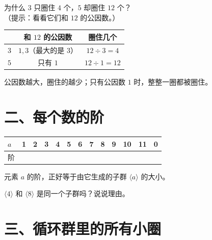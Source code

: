 \begin{sikao}
  为什么 \(3\) 只圈住 \(4\) 个，\(5\) 却圈住 \(12\) 个？\\
  （提示：看看它们和 \(12\) 的公因数。）
\end{sikao}

\begin{example}
  \begin{center}
  \begin{tabular}{@{}lcc@{}}
    \toprule
     & 和 \(12\) 的公因数 & 圈住几个 \\
    \midrule
    \(3\) & \(1,3\)（最大的是 \(3\)） & \(12\div3=4\) \\
    \(5\) & 只有 \(1\) & \(12\div1=12\) \\
    \bottomrule
  \end{tabular}
  \end{center}
  公因数越大，圈住的越少；只有公因数 \(1\) 时，整整一圈都被圈住。
\end{example}

\section*{二、每个数的阶}

\begin{dongshou}
  \begin{center}
  {\small
  \begin{tabular}{@{}l*{12}{c}@{}}
    \toprule
    \(a\) & 1 & 2 & 3 & 4 & 5 & 6 & 7 & 8 & 9 & 10 & 11 & 0 \\
    \midrule
    阶 & & & & & & & & & & & & \\
    \bottomrule
  \end{tabular}}
  \end{center}
\end{dongshou}

\begin{dingli}[阶与生成子群]
  元素 \(a\) 的阶，正好等于由它生成的子群 \(\langle a\rangle\) 的大小。
\end{dingli}

\begin{sikao}
  \(\langle4\rangle\) 和 \(\langle8\rangle\) 是同一个子群吗？说说理由。
\end{sikao}

\section*{三、循环群里的所有小圈}

